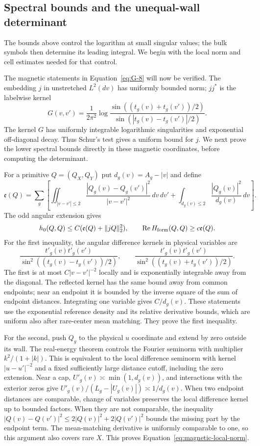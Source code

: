 \subsection{Spectral bounds and the unequal-wall determinant}

The bounds above control the logarithm at small singular values; the
bulk symbols then determine its leading integral. We begin with the
local norm and cell estimates needed for that control.

The magnetic statements in Equation~\eqref{eq:G-8} will now be verified. The embedding \(j\) in unstretched \(L^2(dv)\) has uniformly bounded norm; \(jj^*\) is the labelwise kernel
\[
 G(v,v')=\frac1{2\pi^2}\log\frac{\sin((t_g(v)+t_g(v'))/2)}
                              {\sin(|t_g(v)-t_g(v')|/2)}.
\] The kernel $G$ has uniformly integrable logarithmic singularities and
exponential off-diagonal decay. Thus Schur's test gives a uniform bound
for $j$. We next prove the lower spectral bounds directly in these
magnetic coordinates, before computing the determinant.

For a primitive $Q=(Q_X,Q_Y)$ put $d_g(v)=A_g-|v|$ and define
\[
 \mathfrak e(Q)=\sum_g\left[
 \iint_{|v-v'|\le2}
 \frac{|Q_g(v)-Q_g(v')|^2}{|v-v'|^2}\,dv\,dv'
 +\int_{d_g(v)\le2}\frac{|Q_g(v)|^2}{d_g(v)}\,dv\right].
\]
The odd angular extension gives
\begin{equation}\label{eq:magnetic-local-norm}
 h_0(Q,Q)\le C(\mathfrak e(Q)+\|jQ\|_2^2),\qquad
 \operatorname{Re}H_{\rm form}(Q,Q)\ge c\mathfrak e(Q).
\end{equation}
For the first inequality, the angular difference kernels in physical
variables are
\[
 \frac{t'_g(v)t'_g(v')}{\sin^2((t_g(v)-t_g(v'))/2)},\qquad
 \frac{t'_g(v)t'_g(v')}{\sin^2((t_g(v)+t_g(v'))/2)}.
\]
The first is at most $C|v-v'|^{-2}$ locally and is exponentially
integrable away from the diagonal. The reflected kernel has the same
bound away from common endpoints; near an endpoint it is bounded by
the inverse square of the sum of endpoint distances. Integrating one
variable gives $C/d_g(v)$. These statements use the exponential
reference density and its relative derivative bounds, which are uniform
also after rare-center mean matching. They prove the first inequality.

For the second, push $Q_g$ to the physical $u$ coordinate and extend
by zero outside its wall. The real-energy theorem controls the Fourier
seminorm with multiplier $k^2/(1+|k|)$. This is equivalent to the local
difference seminorm with kernel $|u-u'|^{-2}$ and a fixed sufficiently
large distance cutoff, including the zero extension. Near a cap,
$U'_g(v)\asymp\min(1,d_g(v))$, and interactions with the exterior
zeros give
$U'_g(v)/(L_g-|U_g(v)|)\asymp1/d_g(v)$. When two endpoint distances
are comparable, change of variables preserves the local difference
kernel up to bounded factors. When they are not comparable, the
inequality $|Q(v)-Q(v')|^2\le2|Q(v)|^2+2|Q(v')|^2$ bounds the
missing part by the endpoint term. The mean-matching derivative is
uniformly comparable to one, so this argument also covers rare $X$.
This proves Equation~\eqref{eq:magnetic-local-norm}.

